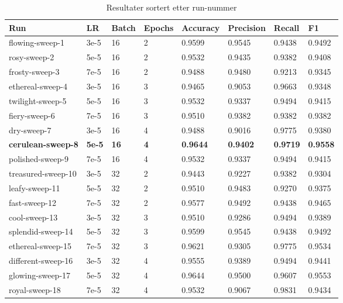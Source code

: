 \begin{table}
\caption{Resultater sortert etter run-nummer}
\label{tab:results}
\begin{tabular}{llllllll}
\toprule
Run & LR & Batch & Epochs & Accuracy & Precision & Recall & F1 \\
\midrule
flowing-sweep-1 & 3e-5 & 16 & 2 & 0.9599 & 0.9545 & 0.9438 & 0.9492 \\
rosy-sweep-2 & 5e-5 & 16 & 2 & 0.9532 & 0.9435 & 0.9382 & 0.9408 \\
frosty-sweep-3 & 7e-5 & 16 & 2 & 0.9488 & 0.9480 & 0.9213 & 0.9345 \\
ethereal-sweep-4 & 3e-5 & 16 & 3 & 0.9465 & 0.9053 & 0.9663 & 0.9348 \\
twilight-sweep-5 & 5e-5 & 16 & 3 & 0.9532 & 0.9337 & 0.9494 & 0.9415 \\
fiery-sweep-6 & 7e-5 & 16 & 3 & 0.9510 & 0.9382 & 0.9382 & 0.9382 \\
dry-sweep-7 & 3e-5 & 16 & 4 & 0.9488 & 0.9016 & 0.9775 & 0.9380 \\
\textbf{cerulean-sweep-8} & \textbf{5e-5} & \textbf{16} & \textbf{4} & \textbf{0.9644} & \textbf{0.9402} & \textbf{0.9719} & \textbf{0.9558} \\
polished-sweep-9 & 7e-5 & 16 & 4 & 0.9532 & 0.9337 & 0.9494 & 0.9415 \\
treasured-sweep-10 & 3e-5 & 32 & 2 & 0.9443 & 0.9227 & 0.9382 & 0.9304 \\
leafy-sweep-11 & 5e-5 & 32 & 2 & 0.9510 & 0.9483 & 0.9270 & 0.9375 \\
fast-sweep-12 & 7e-5 & 32 & 2 & 0.9577 & 0.9492 & 0.9438 & 0.9465 \\
cool-sweep-13 & 3e-5 & 32 & 3 & 0.9510 & 0.9286 & 0.9494 & 0.9389 \\
splendid-sweep-14 & 5e-5 & 32 & 3 & 0.9599 & 0.9545 & 0.9438 & 0.9492 \\
ethereal-sweep-15 & 7e-5 & 32 & 3 & 0.9621 & 0.9305 & 0.9775 & 0.9534 \\
different-sweep-16 & 3e-5 & 32 & 4 & 0.9555 & 0.9389 & 0.9494 & 0.9441 \\
glowing-sweep-17 & 5e-5 & 32 & 4 & 0.9644 & 0.9500 & 0.9607 & 0.9553 \\
royal-sweep-18 & 7e-5 & 32 & 4 & 0.9532 & 0.9067 & 0.9831 & 0.9434 \\
\bottomrule
\end{tabular}
\end{table}
